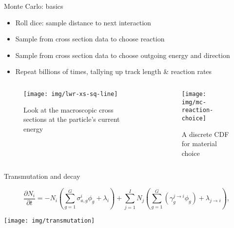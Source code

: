 \documentclass[pdf,aspectratio=169]{beamer}
\begin{document}
\begin{frame}{Monte Carlo: basics}
        \begin{itemize}
            \item Roll dice: sample distance to next interaction
            \item Sample from cross section data to choose reaction
            \item Sample from cross section data to choose outgoing energy and direction
            \item Repeat billions of times, tallying up track length \& reaction rates
        \end{itemize}
\begin{columns}
    \begin{column}{0.5\textwidth}
        \begin{figure}[ht]
        \centering
            \texttt{[image: img/lwr-xs-sq-line]}
            \caption{\tiny Look at the macroscopic cross sections at the particle's current energy} 
        \end{figure}
    \end{column}
    \begin{column}{0.5\textwidth}
        \begin{figure}[ht]
        \centering
            \texttt{[image: img/mc-reaction-choice]}
            \caption{\tiny A discrete CDF for material choice} 
        \end{figure}
    \end{column}
\end{columns}
\end{frame}

\begin{frame}{Transmutation and decay}

\begin{equation}
\frac{\partial N_{i}}{\partial t}=-N_{i}\left(\sum_{g=1}^{G}\sigma_{a,g}^{i}\phi_{g}+\lambda_{i}\right)+\sum_{j=1}^{I}N_{j}\left(\sum_{g=1}^{G}\left(\gamma_{g}^{j\rightarrow i}\phi_{g}\right)+\lambda_{j\rightarrow i}\right),\label{eq:transmutation_rates}
\end{equation}

    \begin{center}
    \texttt{[image: img/transmutation]}
    \end{center}
\end{frame}
\end{document}
